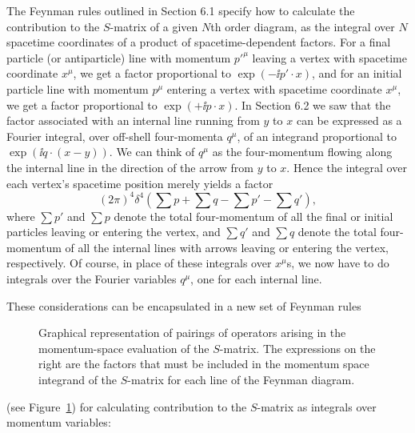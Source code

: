 The Feynman rules outlined in Section 6.1 specify how to calculate the
contribution to the $S$-matrix of a given $N$th order diagram, as the integral
over $N$ spacetime coordinates of a product of spacetime-dependent factors.
For a final particle (or antiparticle) line with momentum $p'^\mu$ leaving a
vertex with spacetime coordinate $x^\mu$, we get a factor proportional to
$\exp(-\ii p'\cdot x)$, and for an initial particle line with momentum $p^\mu$
entering a vertex with spacetime coordinate $x^\mu$, we get a factor
proportional to $\exp(+\ii p\cdot x)$. In Section 6.2 we saw that the factor
associated with an internal line running from $y$ to $x$ can be expressed as a
Fourier integral, over off-shell four-momenta $q^\mu$, of an integrand
proportional to $\exp(\ii q\cdot(x-y))$. We can think of $q^\mu$ as the
four-momentum flowing along the internal line in the direction of the arrow
from $y$ to $x$. Hence the integral over each vertex's spacetime position
merely yields a factor
\begin{equation}
(2\pi)^4\delta^4\left(\sum p+\sum q-\sum p'-\sum q'\right),
\tag{6.3.1}
\label{eq:6.3.1}
\end{equation}
where $\sum p'$ and $\sum p$ denote the total four-momentum of all the final or
initial particles leaving or entering the vertex, and $\sum q'$ and $\sum q$
denote the total four-momentum of all the internal lines with arrows leaving or
entering the vertex, respectively. Of course, in place of these integrals over
$x^\mu$s, we now have to do integrals over the Fourier variables $q^\mu$, one
for each internal line.

These considerations can be encapsulated in a new set of Feynman rules

\begingroup
\renewcommand{\thefigure}{6.\arabic{figure}}
\setcounter{figure}{8}
\begin{figure}[htbp]

\caption{Graphical representation of pairings of operators arising in the
momentum-space evaluation of the $S$-matrix. The expressions on the right are
the factors that must be included in the momentum space integrand of the
$S$-matrix for each line of the Feynman diagram.}
\label{fig:6.9}
\end{figure}
\endgroup

(see Figure~\ref{fig:6.9}) for calculating contribution to the $S$-matrix as integrals
over momentum variables:

